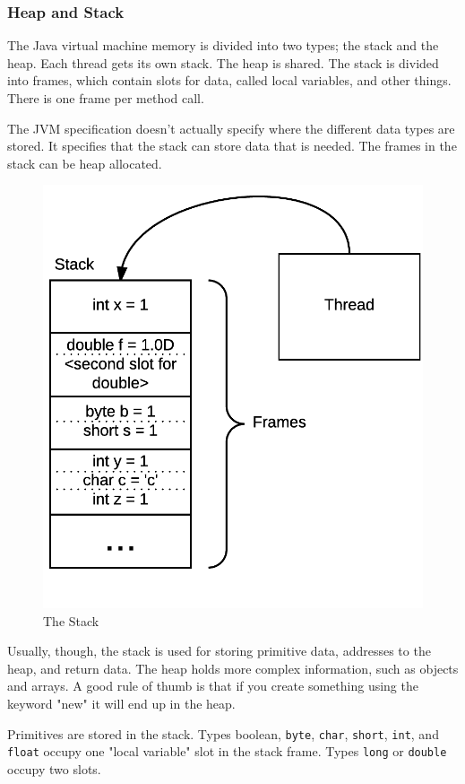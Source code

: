 \subsubsection{Heap and Stack}
The Java virtual machine memory is divided into two types; the stack and the heap. Each thread gets its own stack. The heap is shared. The stack is divided into frames, which contain slots for data, called local variables, and other things. There is one frame per method call.

The JVM specification doesn't actually specify where the different data types are stored. It specifies that the stack can store data that is needed. The frames in the stack can be heap allocated.
\begin{figure}[h]\centering
\includegraphics[width=0.9\linewidth, frame]{images/stack}
\caption{The Stack}
\label{fig:stack}
\end{figure}
Usually, though, the stack is used for storing primitive data, addresses to the heap, and return data. The heap holds more complex information, such as objects and arrays. A good rule of thumb is that if you create something using the keyword "new" it will end up in the heap.

Primitives are stored in the stack. Types boolean, \texttt{byte}, \texttt{char}, \texttt{short}, \texttt{int}, and \texttt{float} occupy one "local variable" slot in the stack frame. Types \texttt{long} or \texttt{double} occupy two slots. \cite{gosling}

